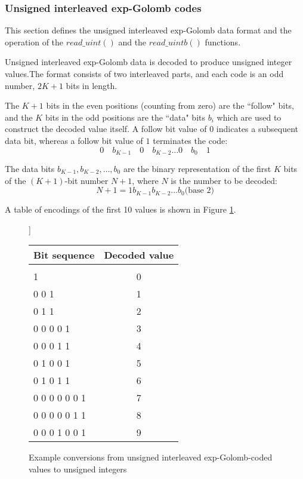 \subsubsection{Unsigned interleaved exp-Golomb codes}
This section defines the unsigned interleaved exp-Golomb data format and the operation
of the $read\_uint()$ and the $read\_uintb()$ functions. 

Unsigned interleaved exp-Golomb data is decoded to produce unsigned
 integer values.The format consists of two interleaved parts, 
and each code is an odd number, $2K+1$ bits in length.

The $K+1$ bits in the even positions (counting from zero) are the ``follow" bits, and 
the $K$ bits in the odd positions are the ``data" bits $b_i$ which are used to construct
the decoded value itself. A follow bit value of $0$ indicates a subsequent data bit,
whereas a follow bit value of $1$ terminates the code:
\begin{equation*}
0\quad b_{K-1}\quad 0\quad b_{K-2}\hdots 0\quad b_{0}\quad 1
\end{equation*}

The data bits $b_{K-1}, b_{K-2}, \hdots, b_0$ are the binary representation 
 of the first $K$ bits of the $(K+1)$-bit number 
$N+1$, where $N$ is the number to be decoded:
\begin{equation*}
N+1=1 b_{K-1} b_{K-2}\hdots b_0 \text{(base $2$)}
\end{equation*}

A table of encodings of the first 10 values is shown in Figure \ref{uegolcodings}.

\begin{figure}[!ht]]
\centering
\begin{tabular}{l|c}
Bit sequence & Decoded value \\
\hline\\
1                 &  0\\
0 0 1             &  1\\
0 1 1             &  2\\
0 0 0 0 1         &  3\\
0 0 0 1 1         &  4\\
0 1 0 0 1         &  5\\
0 1 0 1 1         &  6\\
0 0 0 0 0 0 1     &  7\\
0 0 0 0 0 1 1     &  8\\
0 0 0 1 0 0 1     &  9\\
\end{tabular}

\caption{Example conversions from unsigned interleaved exp-Golomb-coded 
values to unsigned integers \label{uegolcodings}}
\end{figure}


